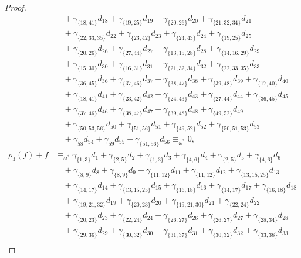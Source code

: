 \documentclass[reqno]{amsart}
\theoremstyle{plain}
\theoremstyle{definition}
\theoremstyle{plain}
\theoremstyle{definition}
\numberwithin{equation}{section}
\begin{document}
\begin{proof}
\begin{align*}
&\quad + \gamma_{\{18,41\}}d_{18} + \gamma_{\{19,25\}}d_{19} + \gamma_{\{20,26\}}d_{20} + \gamma_{\{21,32,34\}}d_{21}\\ 
&\quad + \gamma_{\{22,33,35\}}d_{22} + \gamma_{\{23,42\}}d_{23} + \gamma_{\{24,43\}}d_{24} + \gamma_{\{19,25\}}d_{25}\\ 
&\quad + \gamma_{\{20,26\}}d_{26} + \gamma_{\{27,44\}}d_{27} + \gamma_{\{13,15,28\}}d_{28} + \gamma_{\{14,16,29\}}d_{29}\\ 
&\quad + \gamma_{\{15,30\}}d_{30} + \gamma_{\{16,31\}}d_{31} + \gamma_{\{21,32,34\}}d_{32} + \gamma_{\{22,33,35\}}d_{33}\\ 
&\quad + \gamma_{\{36,45\}}d_{36} + \gamma_{\{37,46\}}d_{37} + \gamma_{\{38,47\}}d_{38} + \gamma_{\{39,48\}}d_{39} + \gamma_{\{17,40\}}d_{40}\\ 
&\quad + \gamma_{\{18,41\}}d_{41} + \gamma_{\{23,42\}}d_{42} + \gamma_{\{24,43\}}d_{43} + \gamma_{\{27,44\}}d_{44} + \gamma_{\{36,45\}}d_{45}\\ 
&\quad + \gamma_{\{37,46\}}d_{46} + \gamma_{\{38,47\}}d_{47} + \gamma_{\{39,48\}}d_{48} + \gamma_{\{49,52\}}d_{49}\\ 
&\quad + \gamma_{\{50,53,56\}}d_{50} + \gamma_{\{51,56\}}d_{51} + \gamma_{\{49,52\}}d_{52} + \gamma_{\{50,51,53\}}d_{53}\\ 
&\quad + \gamma_{58}d_{54} + \gamma_{59}d_{55} + \gamma_{\{51,56\}}d_{56} \equiv_{\omega^*} 0,\\
\rho_3(f) + f &\equiv_{\omega^*} \gamma_{\{1,3\}}d_{1} + \gamma_{\{2,5\}}d_{2} + \gamma_{\{1,3\}}d_{3} + \gamma_{\{4,6\}}d_{4} + \gamma_{\{2,5\}}d_{5} + \gamma_{\{4,6\}}d_{6}\\ 
&\quad + \gamma_{\{8,9\}}d_{8} + \gamma_{\{8,9\}}d_{9} + \gamma_{\{11,12\}}d_{11} + \gamma_{\{11,12\}}d_{12} + \gamma_{\{13,15,25\}}d_{13}\\ 
&\quad + \gamma_{\{14,17\}}d_{14} + \gamma_{\{13,15,25\}}d_{15} + \gamma_{\{16,18\}}d_{16} + \gamma_{\{14,17\}}d_{17} + \gamma_{\{16,18\}}d_{18}\\ 
&\quad + \gamma_{\{19,21,32\}}d_{19} + \gamma_{\{20,23\}}d_{20} + \gamma_{\{19,21,30\}}d_{21} + \gamma_{\{22,24\}}d_{22}\\ 
&\quad + \gamma_{\{20,23\}}d_{23} + \gamma_{\{22,24\}}d_{24} + \gamma_{\{26,27\}}d_{26} + \gamma_{\{26,27\}}d_{27} + \gamma_{\{28,34\}}d_{28}\\ 
&\quad + \gamma_{\{29,36\}}d_{29} + \gamma_{\{30,32\}}d_{30} + \gamma_{\{31,37\}}d_{31} + \gamma_{\{30,32\}}d_{32} + \gamma_{\{33,38\}}d_{33}\\ 

\end{align*}
\end{proof}
\end{document}
